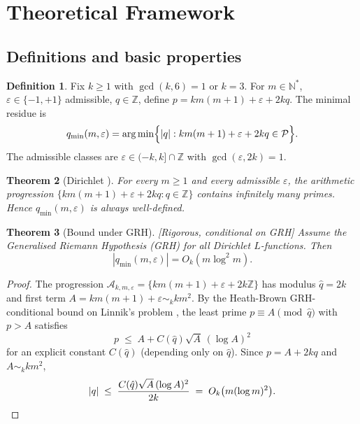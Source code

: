 \documentclass[11pt,a4paper]{article}
\newtheorem{theorem}{Theorem}[section]
\theoremstyle{definition}
\newtheorem{definition}[theorem]{Definition}
\theoremstyle{remark}
\newcommand{\N}{\mathbb{N}}
\newcommand{\Z}{\mathbb{Z}}
\newcommand{\qmin}{q_{\min}}
\newcommand{\eps}{\varepsilon}
\begin{document}
\section{Theoretical Framework}\label{sec:framework}

\subsection{Definitions and basic properties}

\begin{definition}\label{def:family}
Fix $k\ge 1$ with $\gcd(k,6)=1$ or $k=3$. For $m\in\N^{*}$,
$\eps\in\{-1,+1\}$ admissible, $q\in\Z$, define
$p=km(m+1)+\eps+2kq$. The minimal residue is
\[
  \qmin(m,\eps)=\arg\min\Bigl\{|q|:km(m+1)+\eps+2kq\in\mathcal{P}\Bigr\}.
\]
The admissible classes are $\eps\in(-k,k]\cap\Z$ with
$\gcd(\eps,2k)=1$.
\end{definition}

\begin{rigorousbox}
\begin{theorem}[Dirichlet \cite{Dirichlet1837}]\label{thm:Dirichlet}
For every $m\ge 1$ and every admissible $\eps$, the arithmetic
progression $\{km(m+1)+\eps+2kq:q\in\Z\}$ contains infinitely many
primes. Hence $\qmin(m,\eps)$ is always well-defined.
\end{theorem}
\end{rigorousbox}

\begin{theorem}[Bound under GRH]\label{thm:GRH-bound}
\textnormal{[Rigorous, conditional on GRH]} Assume the Generalised
Riemann Hypothesis (GRH) for all Dirichlet $L$-functions. Then
\[
  |\qmin(m,\eps)|=O_{k}(m\log^{2}m).
\]
\end{theorem}

\begin{proof}[Proof]
The progression $\mathcal{A}_{k,m,\eps}=\{km(m+1)+\eps+2k\Z\}$ has
modulus $\hat{q}=2k$ and first term $A=km(m+1)+\eps\sim_{k}km^{2}$.
By the Heath-Brown GRH-conditional bound on Linnik's
problem \cite{HeathBrown1992}, the least prime $p\equiv A\pmod{\hat{q}}$
with $p>A$ satisfies
\[
  p\;\le\;A+C(\hat{q})\sqrt{A}\,(\log A)^{2}
\]
for an explicit constant $C(\hat{q})$ (depending only on $\hat{q}$).
Since $p=A+2kq$ and $A\sim_{k}km^{2}$,
\[
  |q|\;\le\;\frac{C(\hat{q})\sqrt{A}\,(\log A)^{2}}{2k}
       \;=\;O_{k}\bigl(m(\log m)^{2}\bigr).\qedhere
\]
\end{proof}
\end{document}
